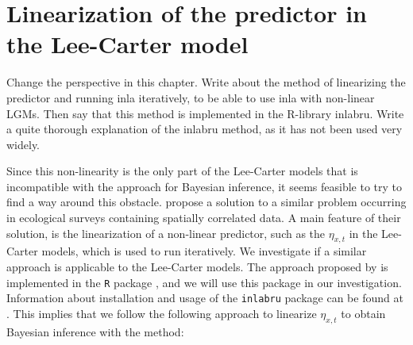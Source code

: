 \newpage
\section{Linearization of the predictor in the Lee-Carter model}
\textcolor{myDarkGreen}{
Change the perspective in this chapter. Write about the method of linearizing the predictor and running inla iteratively, to be able to use inla with non-linear LGMs. Then say that this method is implemented in the R-library inlabru. Write a quite thorough explanation of the inlabru method, as it has not been used very widely. 
}

Since this non-linearity is the only part of the Lee-Carter models that is incompatible with the \inla approach for Bayesian inference, it seems feasible to try to find a way around this obstacle. \textcite{BachlLindgren2019} propose a solution to a similar problem occurring in ecological surveys containing spatially correlated data. A main feature of their solution, is the linearization of a non-linear predictor, such as the $\eta_{x,t}$ in the Lee-Carter models, which is used to run \inla iteratively. We investigate if a similar approach is applicable to the Lee-Carter models. The approach proposed by \textcite{BachlLindgren2019} is implemented in the \texttt{R} package , and we will use this package in our investigation. Information about installation and usage of the \texttt{inlabru} package can be found at \cite{Inlabru}. This implies that we follow the following approach to linearize $\eta_{x,t}$ to obtain Bayesian inference with the \inla method:

